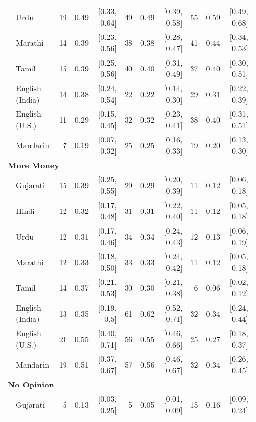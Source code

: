 \begin{table}[t]
\begin{footnotesize}
\begin{tabular}{p{.1in}lrrrrrrrrr}
 & Urdu & 19 & 0.49 & [0.33, 0.64] & 49 & 0.49 & [0.39, 0.58] & 55 & 0.59 & [0.49, 0.68]\\

 & Marathi & 14 & 0.39 & [0.23, 0.56] & 38 & 0.38 & [0.28, 0.47] & 41 & 0.44 & [0.34, 0.53]\\

 & Tamil & 15 & 0.39 & [0.25, 0.56] & 40 & 0.40 & [0.31, 0.49] & 37 & 0.40 & [0.30, 0.51]\\

 & English (India) & 14 & 0.38 & [0.24, 0.54] & 22 & 0.22 & [0.14, 0.30] & 29 & 0.31 & [0.22, 0.39]\\

 & English (U.S.) & 11 & 0.29 & [0.15, 0.45] & 32 & 0.32 & [0.23, 0.41] & 38 & 0.40 & [0.31, 0.51]\\

& Mandarin & 7 & 0.19 & [0.07, 0.32] & 25 & 0.25 & [0.16, 0.33] & 19 & 0.20 & [0.13, 0.30]\\
\midrule
\multicolumn{11}{l}{\textbf{More Money}}\\
 & Gujarati & 15 & 0.39 & [0.25, 0.55] & 29 & 0.29 & [0.20, 0.39] & 11 & 0.12 & [0.06, 0.18]\\

 & Hindi & 12 & 0.32 & [0.17, 0.48] & 31 & 0.31 & [0.22, 0.40] & 11 & 0.12 & [0.05, 0.18]\\

 & Urdu & 12 & 0.31 & [0.17, 0.46] & 34 & 0.34 & [0.24, 0.43] & 12 & 0.13 & [0.06, 0.19]\\

 & Marathi & 12 & 0.33 & [0.18, 0.50] & 33 & 0.33 & [0.24, 0.42] & 11 & 0.12 & [0.05, 0.18]\\

 & Tamil & 14 & 0.37 & [0.21, 0.53] & 30 & 0.30 & [0.21, 0.38] & 6 & 0.06 & [0.02, 0.12]\\

 & English (India) & 13 & 0.35 & [0.19, 0.5] & 61 & 0.62 & [0.52, 0.71] & 32 & 0.34 & [0.24, 0.44]\\

 & English (U.S.) & 21 & 0.55 & [0.40, 0.71] & 56 & 0.55 & [0.46, 0.66] & 25 & 0.27 & [0.18, 0.37]\\

 & Mandarin & 19 & 0.51 & [0.37, 0.67] & 57 & 0.56 & [0.46, 0.67] & 32 & 0.34 & [0.26, 0.45]\\
\midrule
\multicolumn{11}{l}{\textbf{No Opinion}}\\
 & Gujarati & 5 & 0.13 & [0.03, 0.25] & 5 & 0.05 & [0.01, 0.09] & 15 & 0.16 & [0.09, 0.24]\\


\end{tabular}
\end{footnotesize}
\end{table}
